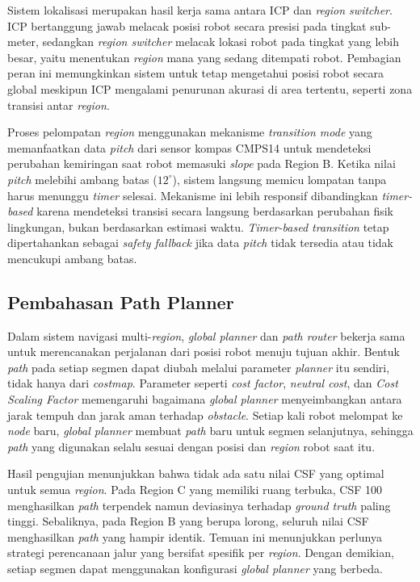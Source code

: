 Sistem lokalisasi merupakan hasil kerja sama antara ICP dan \emph{region switcher}. ICP bertanggung jawab melacak posisi robot secara
presisi pada tingkat sub-meter, sedangkan \emph{region switcher} melacak lokasi
robot pada tingkat yang lebih besar, yaitu menentukan \emph{region} mana yang
sedang ditempati robot. Pembagian peran ini memungkinkan sistem untuk tetap
mengetahui posisi robot secara global meskipun ICP mengalami penurunan akurasi
di area tertentu, seperti zona transisi antar \emph{region}.

Proses pelompatan \emph{region} menggunakan mekanisme \emph{transition mode}
yang memanfaatkan data \emph{pitch} dari sensor kompas CMPS14 untuk mendeteksi
perubahan kemiringan saat robot memasuki \emph{slope} pada Region B. Ketika
nilai \emph{pitch} melebihi ambang batas ($12^\circ$), sistem langsung memicu
lompatan tanpa harus menunggu \emph{timer} selesai. Mekanisme ini lebih responsif
dibandingkan \emph{timer-based} karena mendeteksi transisi secara langsung
berdasarkan perubahan fisik lingkungan, bukan berdasarkan estimasi waktu.
\emph{Timer-based transition} tetap dipertahankan sebagai \emph{safety fallback}
jika data \emph{pitch} tidak tersedia atau tidak mencukupi ambang batas.

\subsection{Pembahasan Path Planner}

Dalam sistem navigasi multi-\emph{region}, \emph{global planner} dan \emph{path
router} bekerja sama untuk merencanakan perjalanan dari posisi robot menuju
tujuan akhir. Bentuk \emph{path} pada setiap segmen dapat diubah melalui parameter
\emph{planner} itu sendiri, tidak hanya dari \emph{costmap}. Parameter
seperti \emph{cost factor}, \emph{neutral cost}, dan \emph{Cost Scaling
Factor} memengaruhi bagaimana \emph{global planner} menyeimbangkan antara
jarak tempuh dan jarak aman terhadap \emph{obstacle}. Setiap kali robot
melompat ke \emph{node} baru, \emph{global planner} membuat \emph{path}
baru untuk segmen selanjutnya, sehingga \emph{path} yang digunakan selalu
sesuai dengan posisi dan \emph{region} robot saat itu.

Hasil pengujian menunjukkan bahwa tidak ada satu nilai CSF yang optimal
untuk semua \emph{region}. Pada Region C yang memiliki ruang
terbuka, CSF 100 menghasilkan \emph{path} terpendek namun deviasinya
terhadap \emph{ground truth} paling tinggi. Sebaliknya, pada Region B
yang berupa lorong, seluruh nilai CSF menghasilkan \emph{path}
yang hampir identik. Temuan ini menunjukkan perlunya strategi
perencanaan jalur yang bersifat spesifik per \emph{region}. Dengan
demikian, setiap segmen dapat menggunakan konfigurasi \emph{global
planner} yang berbeda.


